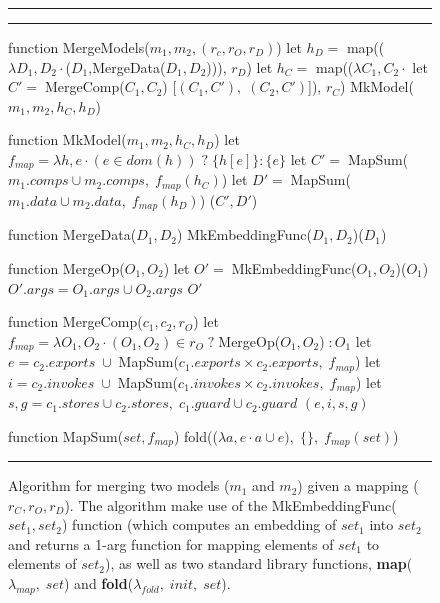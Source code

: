 
\begin{figure}[ht]
\hrule\hrule
\centering
  \begin{slangmath}[numbers=left,emph={MergeModels, MkMap, MkModel,%
                    MergeData, MergeComp, MergeOp, MapSum}]
function MergeModels($m_1, m_2, (r_c,r_O,r_D)$)
  let $h_D=$ map(($\lambda D_1,D_2 \cdot$($D_1$,MergeData($D_1, D_2$))), $r_D$)
  let $h_C=$ map(($\lambda C_1,C_2 \cdot$ 
                 let $C' =\; $MergeComp($C_1, C_2$)
                 [$(C_1, C'),\; (C_2, C')$]), 
               $r_C$)
  MkModel($m_1, m_2, h_C, h_D$)

function MkModel($m_1, m_2, h_C, h_D$)
  let $f_{map} = \lambda h,e \cdot (e \in dom(h)) \;?\; \{h[e]\} : \{e\}$
  let $C' =\; $MapSum($m_1.comps \cup m_2.comps,\; f_{map}(h_C)$)
  let $D' =\; $MapSum($m_1.data \cup m_2.data,\; f_{map}(h_D)$)
  ($C', D'$)

function MergeData($D_1, D_2$)
  MkEmbeddingFunc($D_1, D_2$)($D_1$)
 
function MergeOp($O_1, O_2$)
  let $O'=\; $MkEmbeddingFunc($O_1, O_2$)($O_1$)
  $O'.args= O_1.args \cup O_2.args$ 
  $O'$

function MergeComp($c_1, c_2, r_O$)
  let $f_{map} = \lambda O_1,O_2 \cdot (O_1,O_2)\in r_O\;?\;$MergeOp($O_1,O_2$)$\;: O_1$
  let $e = c_2.exports\;\cup\;$MapSum($c_1.exports \times c_2.exports,\; f_{map}$)
  let $i = c_2.invokes\;\cup\;$MapSum($c_1.invokes \times c_2.invokes,\; f_{map}$)
  let $s, g = c_1.stores \cup c_2.stores,\; c_1.guard \cup c_2.guard$
  $(e, i, s, g)$

function MapSum($set, f_{map}$)
  fold(($\lambda a, e \cdot a \cup e),\; \{\},\; f_{map}(set)$)
  \end{slangmath}
\hrule\vskip7pt
\caption{Algorithm for merging two models ($m_1$ and $m_2$) given a
  mapping ($r_C, r_O, r_D$).  The algorithm make use of the {\rmfamily
    MkEmbeddingFunc($set_1, set_2$)} function (which computes an
  embedding of $set_1$ into $set_2$ and returns a 1-arg function for
  mapping elements of $set_1$ to elements of $set_2$), as well as two
  standard library functions, \textbf{map}($\lambda_{map},\; set$) and
  \textbf{fold}($\lambda_{fold},\; init,\; set$).}
\label{fig-mergingin-alg-func}
\end{figure}
